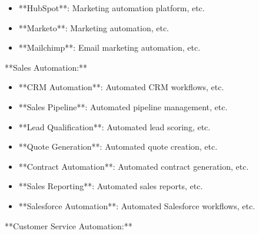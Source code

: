 \documentclass[11pt,a4paper]{article}
\begin{document}
\begin{itemize}
\item **HubSpot**: Marketing automation platform, etc.
\end{itemize}

\begin{itemize}
\item **Marketo**: Marketing automation, etc.
\end{itemize}

\begin{itemize}
\item **Mailchimp**: Email marketing automation, etc.
\end{itemize}

**Sales Automation:**

\begin{itemize}
\item **CRM Automation**: Automated CRM workflows, etc.
\end{itemize}

\begin{itemize}
\item **Sales Pipeline**: Automated pipeline management, etc.
\end{itemize}

\begin{itemize}
\item **Lead Qualification**: Automated lead scoring, etc.
\end{itemize}

\begin{itemize}
\item **Quote Generation**: Automated quote creation, etc.
\end{itemize}

\begin{itemize}
\item **Contract Automation**: Automated contract generation, etc.
\end{itemize}

\begin{itemize}
\item **Sales Reporting**: Automated sales reports, etc.
\end{itemize}

\begin{itemize}
\item **Salesforce Automation**: Automated Salesforce workflows, etc.
\end{itemize}

**Customer Service Automation:**
\end{document}
